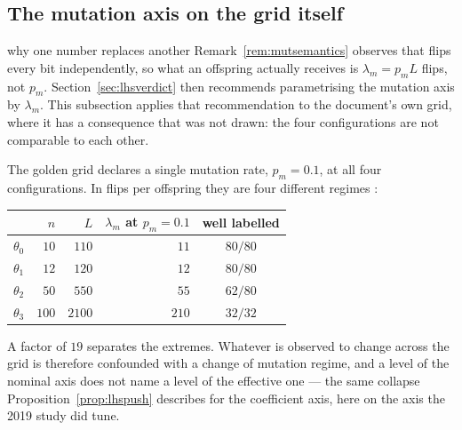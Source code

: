 
\subsection{The mutation axis on the grid itself}\label{sec:mutgrid}

\begin{whatis}{why one number replaces another}
Remark~\ref{rem:mutsemantics} observes that  flips every bit independently, so
what an offspring actually receives is $\lambda_m=p_mL$ flips, not $p_m$. Section~\ref{sec:lhsverdict}
then recommends parametrising the mutation axis by $\lambda_m$. This subsection applies that
recommendation to the document's own grid, where it has a consequence that was not drawn: the
four configurations are not comparable to each other.
\end{whatis}

The golden grid declares a single mutation rate, $p_m=0.1$, at all four configurations. In
flips per offspring they are four different regimes :

\begin{center}\small
\begin{tabular}{@{}lrrrc@{}}
\toprule
 & $n$ & $L$ & $\lambda_m$ at $p_m=0.1$ & well labelled \\
\midrule
$\theta_0$ & $10$  & $110$  & $11$  & $80/80$ \\
$\theta_1$ & $12$  & $120$  & $12$  & $80/80$ \\
$\theta_2$ & $50$  & $550$  & $55$  & $62/80$ \\
$\theta_3$ & $100$ & $2100$ & $210$ & $32/32$ \\
\bottomrule
\end{tabular}
\end{center}

A factor of $19$ separates the extremes. Whatever is observed to change across the grid is
therefore confounded with a change of mutation regime, and a level of the nominal axis does
not name a level of the effective one --- the same collapse Proposition~\ref{prop:lhspush}
describes for the coefficient axis, here on the axis the 2019 study did tune.

